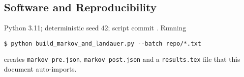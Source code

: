 \subsection{Software and Reproducibility}
Python 3.11; deterministic seed $42$; script commit
\texttt{\ScriptHash}.  Running
\begin{verbatim}
$ python build_markov_and_landauer.py --batch repo/*.txt
\end{verbatim}
creates \texttt{markov\_pre.json}, \texttt{markov\_post.json} and a
\texttt{results.tex} file that this document auto-imports.

